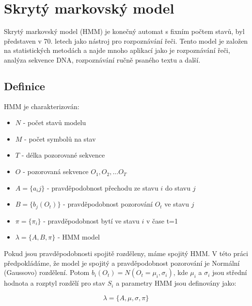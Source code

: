 \section{Skrytý markovský model}

Skrytý markovský model (HMM) je konečný automat s fixním počtem stavů, byl představen v 70. letech jako nástroj pro
rozpoznávání řeči. Tento model je založen na statistických metodách a najde mnoho aplikací jako je rozpoznávání řeči,
analýza sekvence DNA, rozpoznávání ručně psaného textu a další.

\subsection{Definice}
HMM je charakterizován:
\begin{itemize}
    \item \(N\) - počet stavů modelu
    \item \(M\) - počet symbolů na stav
    \item \(T\) - délka pozorované sekvence
    \item \(O\) - pozorovaná sekvence \(O_1, O_2, ... O_T\)
    \item \(A = \{a_ij\}\) - pravděpodobnost přechodu ze stavu \(i\) do stavu \(j\)
    \item \(B = \{b_j(O_t)\}\) - pravděpodobnost pozorování \(O_t\) ve stavu \(j\)
    \item \(\pi = \{\pi_i\}\) - pravděpodobnost bytí ve stavu \(i\) v čase t=1
    \item \(\lambda = \{A, B, \pi\}\) - HMM model
\end{itemize}

Pokud jsou pravděpodobnosti spojitě rozděleny, máme spojitý HMM. V této práci předpokládáme, že
model je spojitý a pravděpodobnost pozorování je Normální (Gaussovo) rozdělení. Potom \(b_i(O_t) = N(O_t = \mu_i, \sigma_i)\), kde \(\mu_i\) a \(\sigma_i\) jsou střední hodnota a rozptyl rozdělí pro stav \(S_i\) a parametry HMM jsou definovány jako:

\[ \lambda = \{A, \mu, \sigma, \pi\} \]

